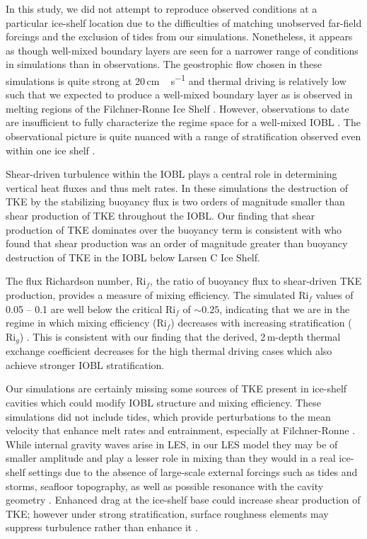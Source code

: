 \documentclass[tc, manuscript]{copernicus}
\begin{document}
In this study, we did not attempt to reproduce observed conditions at a particular ice-shelf location due to the difficulties of matching unobserved far-field forcings and the exclusion of tides from our simulations. Nonetheless, it appears as though well-mixed boundary layers are seen for a narrower range of conditions in simulations than in observations. The geostrophic flow chosen in these simulations is quite strong at 20\,\unit{cm\,s^{-1}} and thermal driving is relatively low such that we expected to produce a well-mixed boundary layer as is observed in melting regions of the Filchner-Ronne Ice Shelf \citep{nicholls_oceanographic_2001}. However, observations to date are insufficient to fully characterize the regime space for a well-mixed IOBL \citep{malyarenko_synthesis_2020}. The observational picture is quite nuanced with a range of stratification observed even within one ice shelf \citep{hattermann_two_2012}. 

Shear-driven turbulence within the IOBL plays a central role in determining vertical heat fluxes and thus melt rates. In these simulations the destruction of TKE by the stabilizing buoyancy flux is two orders of magnitude smaller than shear production of TKE throughout the IOBL. Our finding that shear production of TKE dominates over the buoyancy term is consistent with \citet{davis_turbulence_2019} who found that shear production was an order of magnitude greater than buoyancy destruction of TKE in the IOBL below Larsen C Ice Shelf. 

The flux Richardson number, $\text{Ri}_f$, the ratio of buoyancy flux to shear-driven TKE production, provides a measure of mixing efficiency. The simulated $\text{Ri}_f$ values of 0.05 -- 0.1 are well below the critical $\text{Ri}_f$ of $\sim\!0.25$, indicating that we are in the regime in which mixing efficiency ($\text{Ri}_f$) decreases with increasing stratification ($\text{Ri}_g$) \citep{miles_stability_1961, howard_note_1961, armenio_investigation_2002, peltier_mixing_2003}. This is consistent with our finding that the derived, 2\,\unit{m}-depth thermal exchange coefficient decreases for the high thermal driving cases which also achieve stronger IOBL stratification.

Our simulations are certainly missing some sources of TKE present in ice-shelf cavities which could modify IOBL structure and mixing efficiency. These simulations did not include tides, which provide perturbations to the mean velocity that enhance melt rates and entrainment, especially at Filchner-Ronne \citep{makinson_modeling_1999, makinson_influence_2011, mueller_tidal_2018}. While internal gravity waves arise in LES, in our LES model they may be of smaller amplitude and play a lesser role in mixing than they would in a real ice-shelf settings due to the absence of large-scale external forcings such as tides and storms, seafloor topography, as well as possible resonance with the cavity geometry \citep{gwyther_cold_2020, mueller_impact_2012, padman_ocean_2018, robertson_tidally_2013}. Enhanced drag at the ice-shelf base could increase shear production of TKE; however under strong stratification, surface roughness elements may suppress turbulence rather than enhance it \citep{ohya_wind-tunnel_2001}. 
\end{document}
